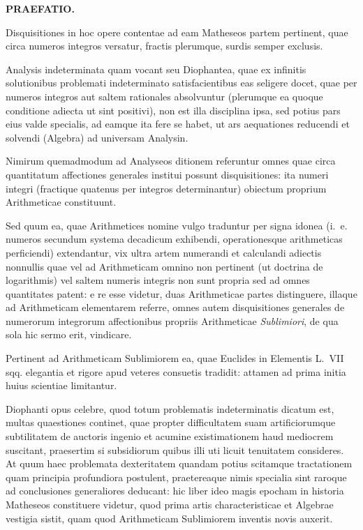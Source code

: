 \documentclass[12pt,a4paper]{article}
\theoremstyle{plain}
\theoremstyle{definition}
\theoremstyle{remark}
\begin{document}
\begin{center}
{\Large\bfseries PRAEFATIO.}
\end{center}

\vspace{0.3cm}
\noindent
Disquisitiones in hoc opere contentae ad eam Matheseos partem pertinent, quae circa numeros integros versatur, fractis plerumque, surdis semper exclusis.

Analysis indeterminata quam vocant seu Diophantea, quae ex infinitis solutionibus problemati indeterminato satisfacientibus eas seligere docet, quae per numeros integros aut saltem rationales absolvuntur (plerumque ea quoque conditione adiecta ut sint positivi), non est illa disciplina ipsa, sed potius pars eius valde specialis, ad eamque ita fere se habet, ut ars aequationes reducendi et solvendi (Algebra) ad universam Analysin.

Nimirum quemadmodum ad Analyseos ditionem referuntur omnes quae circa quantitatum affectiones generales institui possunt disquisitiones: ita numeri integri (fractique quatenus per integros determinantur) obiectum proprium Arithmeticae constituunt.

Sed quum ea, quae Arithmetices nomine vulgo traduntur per signa idonea (i.~e. numeros secundum systema decadicum exhibendi, operationesque arithmeticas perficiendi) extendantur, vix ultra artem numerandi et calculandi adiectis nonnullis quae vel ad Arithmeticam omnino non pertinent (ut doctrina de logarithmis) vel saltem numeris integris non sunt propria sed ad omnes quantitates patent: e re esse videtur, duas Arithmeticae partes distinguere, illaque ad Arithmeticam elementarem referre, omnes autem disquisitiones generales de numerorum integrorum affectionibus propriis Arithmeticae \emph{Sublimiori}, de qua sola hic sermo erit, vindicare.

Pertinent ad Arithmeticam Sublimiorem ea, quae Euclides in Elementis L.~VII sqq. elegantia et rigore apud veteres consuetis tradidit: attamen ad prima initia huius scientiae limitantur.

Diophanti opus celebre, quod totum problematis indeterminatis dicatum est, multas quaestiones continet, quae propter difficultatem suam artificiorumque subtilitatem de auctoris ingenio et acumine existimationem haud mediocrem suscitant, praesertim si subsidiorum quibus illi uti licuit tenuitatem consideres. At quum haec problemata dexteritatem quandam potius scitamque tractationem quam principia profundiora postulent, praetereaque nimis specialia sint raroque ad conclusiones generaliores deducant: hic liber ideo magis epocham in historia Matheseos constituere videtur, quod prima artis characteristicae et Algebrae vestigia sistit, quam quod Arithmeticam Sublimiorem inventis novis auxerit.
\end{document}
